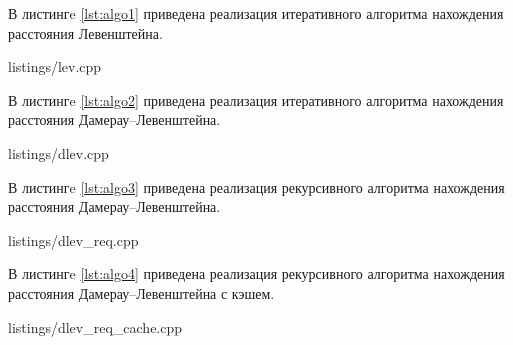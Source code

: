 В листингe \ref{lst:algo1} приведена реализация итеративного алгоритма нахождения расстояния Левенштейна.


\begin{lstinputlisting}[
	label={lst:algo1},
	caption={Итеративный алгоритм нахождения расстояния Левенштейна},
	]{listings/lev.cpp}
\end{lstinputlisting}

\newpage
В листингe \ref{lst:algo2} приведена реализация итеративного алгоритма нахождения расстояния Дамерау--Левенштейна.

\begin{lstinputlisting}[
	caption={Итеративный алгоритм нахождения расстояния Дамерау~---~Левенштейна},
	label={lst:algo2}
	]{listings/dlev.cpp}
\end{lstinputlisting}

\newpage
В листингe \ref{lst:algo3} приведена реализация рекурсивного алгоритма нахождения расстояния Дамерау--Левенштейна.

\begin{lstinputlisting}[
	caption={Рекурсивный алгоритм нахождения расстояния Дамерау~---~Левенштейна},
	label={lst:algo3}
	]{listings/dlev_req.cpp}
\end{lstinputlisting}

\newpage
В листингe \ref{lst:algo4} приведена реализация рекурсивного алгоритма нахождения расстояния Дамерау--Левенштейна с кэшем.

\begin{lstinputlisting}[
	caption={Рекурсивный алгоритм нахождения расстояния Дамерау~---~Левенштейна с кэшем},
	label={lst:algo4}
	]{listings/dlev_req_cache.cpp}
\end{lstinputlisting}